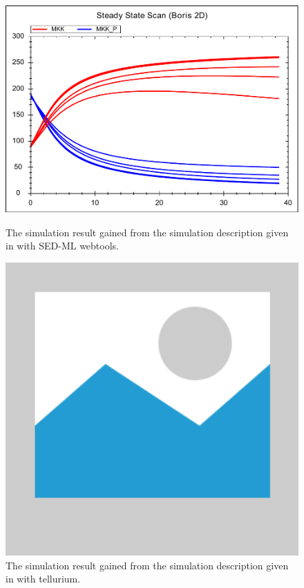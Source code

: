 \begin{figure}[ht]
    \centering
    \begin{minipage}{0.47\textwidth}
        \centering
        \includegraphics[width=1.0\textwidth]{examples/parameter-scan-2d/results/parameter-scan-2d}
        \caption{The simulation result gained from the simulation description given in  with SED-ML webtools.}
    \end{minipage}\hfill
    \begin{minipage}{0.47\textwidth}
        \centering
        \includegraphics[width=1.0\textwidth]{examples/placeholder}
        \caption{The simulation result gained from the simulation description given in  with tellurium.}
    \end{minipage}
    \label{fig:parameter-scan-2d}
\end{figure}

